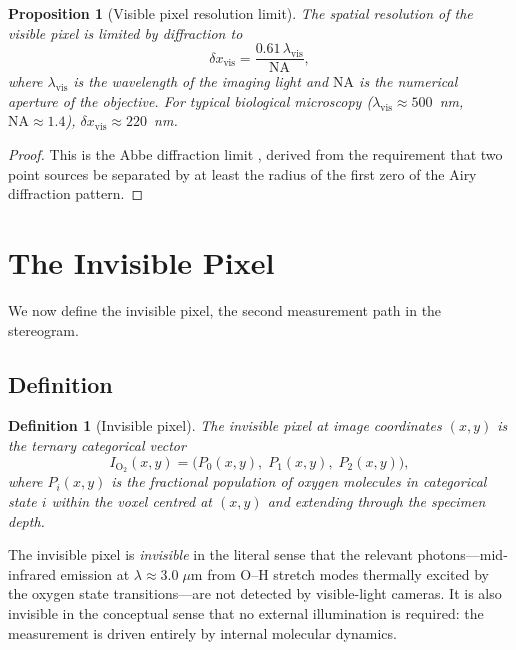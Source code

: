 \documentclass[11pt,twocolumn,a4paper]{article}
\newtheorem{proposition}[theorem]{Proposition}
\newtheorem{definition}{Definition}
\begin{document}
\begin{proposition}[Visible pixel resolution limit]\label{prop:vis_resolution}
The spatial resolution of the visible pixel is limited by diffraction to
\begin{equation}\label{eq:diffraction}
\delta x_{\mathrm{vis}} = \frac{0.61\,\lambda_{\mathrm{vis}}}{\mathrm{NA}},
\end{equation}
where $\lambda_{\mathrm{vis}}$ is the wavelength of the imaging light and $\mathrm{NA}$ is the numerical aperture of the objective.
For typical biological microscopy ($\lambda_{\mathrm{vis}} \approx 500$~nm, $\mathrm{NA} \approx 1.4$), $\delta x_{\mathrm{vis}} \approx 220$~nm.
\end{proposition}
\begin{proof}
This is the Abbe diffraction limit \citep{Abbe1873,Born1999}, derived from the requirement that two point sources be separated by at least the radius of the first zero of the Airy diffraction pattern.
\end{proof}


\section{The Invisible Pixel}\label{sec:invisible}

We now define the invisible pixel, the second measurement path in the stereogram.

\subsection{Definition}

\begin{definition}[Invisible pixel]\label{def:invpixel}
The invisible pixel at image coordinates $(x,y)$ is the ternary categorical vector
\begin{equation}\label{eq:invpixel}
I_{\mathrm{O}_2}(x,y) = \bigl(P_0(x,y),\; P_1(x,y),\; P_2(x,y)\bigr),
\end{equation}
where $P_i(x,y)$ is the fractional population of oxygen molecules in categorical state $i$ within the voxel centred at $(x,y)$ and extending through the specimen depth.
\end{definition}

The invisible pixel is \emph{invisible} in the literal sense that the relevant photons---mid-infrared emission at $\lambda \approx 3.0\;\mu$m from O--H stretch modes thermally excited by the oxygen state transitions---are not detected by visible-light cameras.
It is also invisible in the conceptual sense that no external illumination is required: the measurement is driven entirely by internal molecular dynamics.
\end{document}
